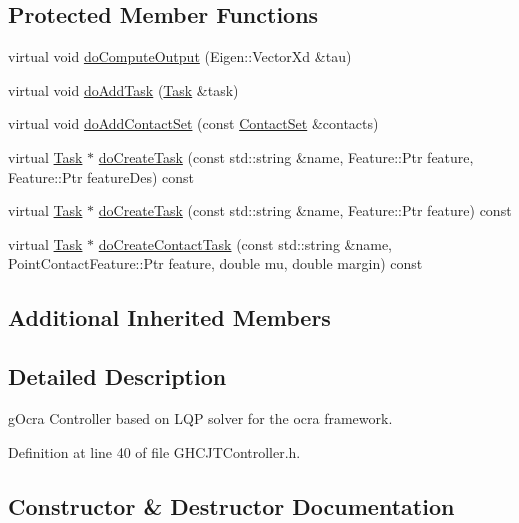 \subsection*{Protected Member Functions}
\begin{DoxyCompactItemize}
\item 
virtual void \hyperlink{classgocra_1_1GHCJTController_a0f2412763e005e9e18b9129e460411bd}{do\+Compute\+Output} (Eigen\+::\+Vector\+Xd \&tau)
\item 
virtual void \hyperlink{classgocra_1_1GHCJTController_a9d25d23ba6abca6870e9a435ab3d2993}{do\+Add\+Task} (\hyperlink{classocra_1_1Task}{Task} \&task)
\item 
virtual void \hyperlink{classgocra_1_1GHCJTController_a28367b3b895eaa223581131258ef5d2d}{do\+Add\+Contact\+Set} (const \hyperlink{classocra_1_1ContactSet}{Contact\+Set} \&contacts)
\item 
virtual \hyperlink{classocra_1_1Task}{Task} $\ast$ \hyperlink{classgocra_1_1GHCJTController_a629d7ecb9716561a1a342e472d551424}{do\+Create\+Task} (const std\+::string \&name, Feature\+::\+Ptr feature, Feature\+::\+Ptr feature\+Des) const 
\item 
virtual \hyperlink{classocra_1_1Task}{Task} $\ast$ \hyperlink{classgocra_1_1GHCJTController_a5da4f9e70a55761065ce606ba468e760}{do\+Create\+Task} (const std\+::string \&name, Feature\+::\+Ptr feature) const 
\item 
virtual \hyperlink{classocra_1_1Task}{Task} $\ast$ \hyperlink{classgocra_1_1GHCJTController_a4d15ad1da5f9a896710cd6c0b8f7bf48}{do\+Create\+Contact\+Task} (const std\+::string \&name, Point\+Contact\+Feature\+::\+Ptr feature, double mu, double margin) const 
\end{DoxyCompactItemize}
\subsection*{Additional Inherited Members}


\subsection{Detailed Description}
g\+Ocra Controller based on L\+QP solver for the ocra framework. 



Definition at line 40 of file G\+H\+C\+J\+T\+Controller.\+h.



\subsection{Constructor \& Destructor Documentation}
